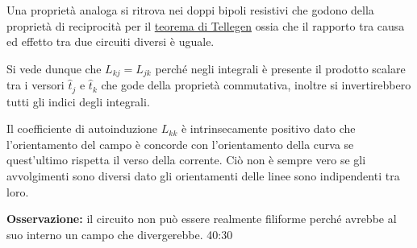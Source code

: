 Una proprietà analoga si ritrova nei doppi bipoli resistivi che godono della proprietà di
reciprocità per il \href{https://it.wikipedia.org/wiki/Teorema_di_Tellegen}{teorema di Tellegen} ossia che il rapporto tra causa ed effetto tra due circuiti diversi è uguale.

Si vede dunque che $L_{kj} = L_{jk}$ perché negli integrali è presente il prodotto
scalare tra i versori $\hat{t}_j$ e $\hat{t}_k$ che gode della proprietà commutativa,
inoltre si invertirebbero tutti gli indici degli integrali.

Il coefficiente di autoinduzione $L_{kk}$ è intrinsecamente positivo dato che 
l'orientamento del campo 
è concorde con l'orientamento della curva se quest'ultimo rispetta il verso della corrente.
Ciò non è sempre vero se gli avvolgimenti sono diversi dato gli orientamenti delle 
linee sono indipendenti tra loro.

\textbf{Osservazione:} il circuito non può essere realmente filiforme perché avrebbe al suo
interno un campo che divergerebbe.
40:30
